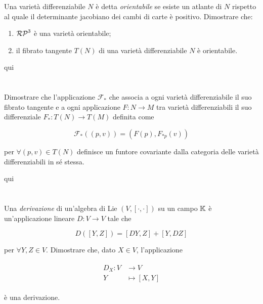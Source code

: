 \begin{tcolorbox}
	Una varietà differenziabile $ N $ è detta \textit{orientabile} se esiste un atlante di $ N $ rispetto al quale il determinante jacobiano dei cambi di carte è positivo. Dimostrare che:
	
	\begin{enumerate}
		\item $ \mathcal{RP}^{3} $ è una varietà orientabile;
		\item il fibrato tangente $ T(N) $ di una varietà differenziabile $ N $ è orientabile.
	\end{enumerate}
\end{tcolorbox}

qui

%

\newpage

%

\section{}\label{es2-27}

\begin{tcolorbox}
	Dimostrare che l'applicazione $ \mathcal{F}_{*} $ che associa a ogni varietà differenziabile il suo fibrato tangente e a ogni applicazione $ F : N \to M $ tra varietà differenziabili il suo differenziale $ F_{*} : T(N) \to T(M) $ definita come
	
	\begin{equation}
		\mathcal{F}_{*}((p,v)) = (F(p), F_{*p}(v))
	\end{equation}

	per $ \forall (p,v) \in T(N) $ definisce un funtore covariante dalla categoria delle varietà differenziabili in sé stessa.
\end{tcolorbox}

qui

%

\newpage

%

\section{}\label{es2-28}

\begin{tcolorbox}
	Una \textit{derivazione} di un'algebra di Lie $ (V,[\cdot,\cdot]) $ su un campo $ \mathbb{K} $ è un'applicazione lineare $ D : V \to V $ tale che
	
	\begin{equation}
		D([Y,Z]) = [DY,Z] + [Y,DZ]
	\end{equation}

	per $ \forall Y,Z \in V $. Dimostrare che, dato $ X \in V $, l'applicazione
	
	\begin{align}
		\begin{split}
			D_{X} : V &\to V\\
			Y &\mapsto [X,Y]
		\end{split}
	\end{align}

	è una derivazione.
\end{tcolorbox}

